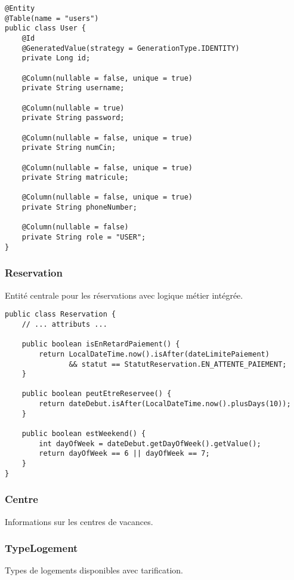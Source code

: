 \documentclass[12pt,a4paper]{article}
\begin{document}
\begin{lstlisting}[caption=Classe User]
@Entity
@Table(name = "users")
public class User {
    @Id
    @GeneratedValue(strategy = GenerationType.IDENTITY)
    private Long id;
    
    @Column(nullable = false, unique = true)
    private String username;
    
    @Column(nullable = true)
    private String password;
    
    @Column(nullable = false, unique = true)
    private String numCin;
    
    @Column(nullable = false, unique = true)
    private String matricule;
    
    @Column(nullable = false, unique = true)
    private String phoneNumber;
    
    @Column(nullable = false)
    private String role = "USER";
}
\end{lstlisting}

\subsubsection{Reservation}
Entité centrale pour les réservations avec logique métier intégrée.

\begin{lstlisting}[caption=Classe Reservation - Méthodes principales]
public class Reservation {
    // ... attributs ...
    
    public boolean isEnRetardPaiement() {
        return LocalDateTime.now().isAfter(dateLimitePaiement) 
               && statut == StatutReservation.EN_ATTENTE_PAIEMENT;
    }
    
    public boolean peutEtreReservee() {
        return dateDebut.isAfter(LocalDateTime.now().plusDays(10));
    }
    
    public boolean estWeekend() {
        int dayOfWeek = dateDebut.getDayOfWeek().getValue();
        return dayOfWeek == 6 || dayOfWeek == 7;
    }
}
\end{lstlisting}

\subsubsection{Centre}
Informations sur les centres de vacances.

\subsubsection{TypeLogement}
Types de logements disponibles avec tarification.
\end{document}
